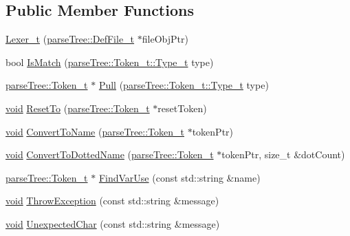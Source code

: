\subsection*{Public Member Functions}
\begin{DoxyCompactItemize}
\item 
\hyperlink{classparser_1_1_lexer__t_a3b619fa6fdaa02aca63a22dfedad9cb1}{Lexer\+\_\+t} (\hyperlink{structparse_tree_1_1_def_file__t}{parse\+Tree\+::\+Def\+File\+\_\+t} $\ast$file\+Obj\+Ptr)
\item 
bool \hyperlink{classparser_1_1_lexer__t_af5667bc29e8f4bfafc60cda984abfbbe}{Is\+Match} (\hyperlink{structparse_tree_1_1_token__t_ac0e6319a9ad80509dd4aa1037ba66096}{parse\+Tree\+::\+Token\+\_\+t\+::\+Type\+\_\+t} type)
\item 
\hyperlink{structparse_tree_1_1_token__t}{parse\+Tree\+::\+Token\+\_\+t} $\ast$ \hyperlink{classparser_1_1_lexer__t_a1fa20e4800fc1522042e32d52a9de284}{Pull} (\hyperlink{structparse_tree_1_1_token__t_ac0e6319a9ad80509dd4aa1037ba66096}{parse\+Tree\+::\+Token\+\_\+t\+::\+Type\+\_\+t} type)
\item 
\hyperlink{_t_e_m_p_l_a_t_e__cdef_8h_ac9c84fa68bbad002983e35ce3663c686}{void} \hyperlink{classparser_1_1_lexer__t_a46cd2e9a399c5a86313d8309bf0478d2}{Reset\+To} (\hyperlink{structparse_tree_1_1_token__t}{parse\+Tree\+::\+Token\+\_\+t} $\ast$reset\+Token)
\item 
\hyperlink{_t_e_m_p_l_a_t_e__cdef_8h_ac9c84fa68bbad002983e35ce3663c686}{void} \hyperlink{classparser_1_1_lexer__t_afdc8e2f5af74f9585d2a9e223d478962}{Convert\+To\+Name} (\hyperlink{structparse_tree_1_1_token__t}{parse\+Tree\+::\+Token\+\_\+t} $\ast$token\+Ptr)
\item 
\hyperlink{_t_e_m_p_l_a_t_e__cdef_8h_ac9c84fa68bbad002983e35ce3663c686}{void} \hyperlink{classparser_1_1_lexer__t_a9841a27715698b13db4c822d9ed606ba}{Convert\+To\+Dotted\+Name} (\hyperlink{structparse_tree_1_1_token__t}{parse\+Tree\+::\+Token\+\_\+t} $\ast$token\+Ptr, size\+\_\+t \&dot\+Count)
\item 
\hyperlink{structparse_tree_1_1_token__t}{parse\+Tree\+::\+Token\+\_\+t} $\ast$ \hyperlink{classparser_1_1_lexer__t_a0219fb1d09222120224fbd87560bd5d0}{Find\+Var\+Use} (const std\+::string \&name)
\item 
\hyperlink{_t_e_m_p_l_a_t_e__cdef_8h_ac9c84fa68bbad002983e35ce3663c686}{void} \hyperlink{classparser_1_1_lexer__t_a732f558af4b7232ee1cafec8d87840d2}{Throw\+Exception} (const std\+::string \&message)
\item 
\hyperlink{_t_e_m_p_l_a_t_e__cdef_8h_ac9c84fa68bbad002983e35ce3663c686}{void} \hyperlink{classparser_1_1_lexer__t_aa4bb9cab015df705b6c0fc52fe0e78e5}{Unexpected\+Char} (const std\+::string \&message)
\end{DoxyCompactItemize}
